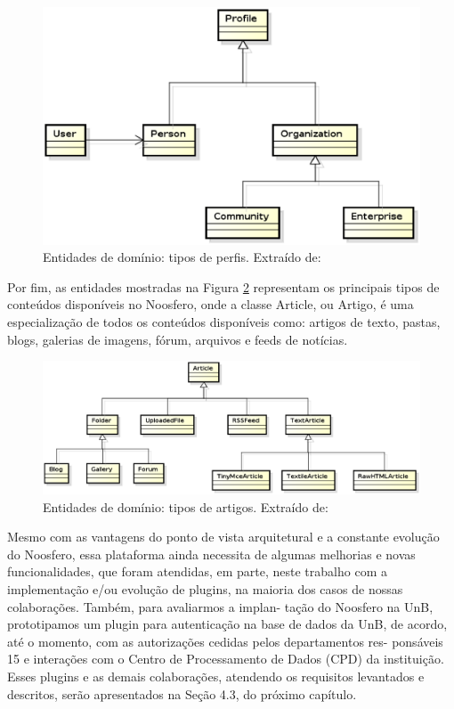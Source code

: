 \begin{figure}[h]
    \centering
    \includegraphics[keepaspectratio=true,scale=0.6]
      {figuras/domain_profiles.eps}
    \caption{Entidades de domínio: tipos de perfis. Extraído de: \cite{bucher2014rede}}
    \label{domain_profiles}
\end{figure}

Por fim, as entidades mostradas na Figura \ref{domain_articles} representam os principais tipos de conteúdos disponíveis no Noosfero, onde a classe Article, ou Artigo, é uma especialização de todos os conteúdos disponíveis como: artigos de texto, pastas, blogs, galerias de imagens, fórum, arquivos e feeds de notícias.

\begin{figure}[h]
    \centering
    \includegraphics[keepaspectratio=true,scale=0.55]
      {figuras/domain_articles.eps}
    \caption{Entidades de domínio: tipos de artigos. Extraído de: \cite{bucher2014rede}}
    \label{domain_articles}
\end{figure}

Mesmo com as vantagens do ponto de vista arquitetural e a constante evolução do
Noosfero, essa plataforma ainda necessita de algumas melhorias e novas funcionalidades,
que foram atendidas, em parte, neste trabalho com a implementação e/ou evolução de
plugins, na maioria dos casos de nossas colaborações. Também, para avaliarmos a implan-
tação do Noosfero na UnB, prototipamos um plugin para autenticação na base de dados
da UnB, de acordo, até o momento, com as autorizações cedidas pelos departamentos res-
ponsáveis 15 e interações com o Centro de Processamento de Dados (CPD) da instituição.
Esses plugins e as demais colaborações, atendendo os requisitos levantados e descritos,
serão apresentados na Seção 4.3, do próximo capítulo.
